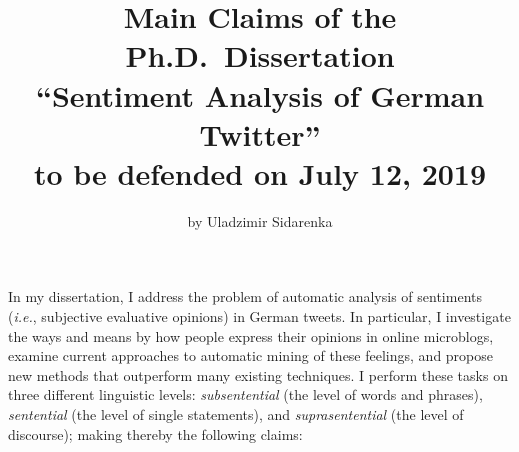 \documentclass[11pt]{article}
\author{\normalsize{}by Uladzimir Sidarenka}
\title{\normalsize{}Main Claims of the Ph.D.~Dissertation\\[0.4em]
  {\Large{}``Sentiment Analysis of German Twitter''}\\[0.4em]
  to be defended on July 12, 2019\vspace{-3ex}}
\date{\vspace{-3ex}}
\newcommand{\ienocomma}{\textit{i.e.}}
\newcommand{\ie}{\ienocomma,}
\begin{document}
\maketitle

In my dissertation, I address the problem of automatic analysis of
sentiments (\ie{} subjective evaluative opinions) in German tweets.
In particular, I investigate the ways and means by how people express
their opinions in online microblogs, examine current approaches to
automatic mining of these feelings, and propose new methods that
outperform many existing techniques.  I perform these tasks on three
different linguistic levels: \emph{subsentential} (the level of words
and phrases), \emph{sentential} (the level of single statements), and
\emph{suprasentential} (the level of discourse); making thereby the
following claims:
\end{document}

